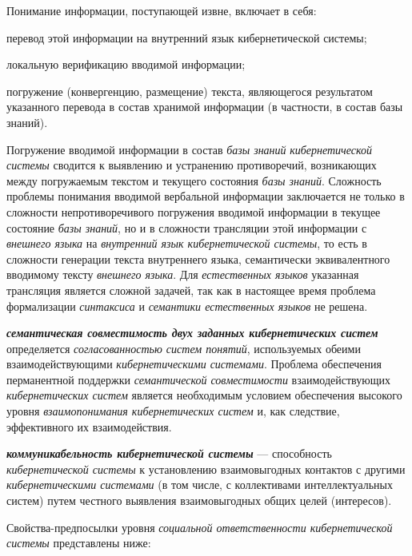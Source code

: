 Понимание информации, поступающей извне, включает в себя:
\begin{textitemize}
    \item перевод этой информации на внутренний язык кибернетической системы;
    \item локальную верификацию вводимой информации;
    \item погружение (конвергенцию, размещение) текста, являющегося результатом указанного перевода в состав хранимой информации (в частности, в состав базы знаний).
\end{textitemize}

Погружение вводимой информации в состав \textit{базы знаний} \textit{кибернетической системы} сводится к выявлению и устранению противоречий, возникающих между погружаемым текстом и текущего состояния \textit{базы знаний}. Сложность проблемы понимания вводимой вербальной информации заключается не только в сложности непротиворечивого погружения вводимой информации в текущее состояние \textit{базы знаний}, но и в сложности трансляции этой информации с \textit{внешнего языка} на \textit{внутренний язык кибернетической системы}, то есть в сложности генерации текста внутреннего языка, семантически эквивалентного вводимому тексту \textit{внешнего языка}.
Для \textit{естественных языков} указанная трансляция является сложной задачей, так как в настоящее время проблема формализации \textit{синтаксиса} и \textit{семантики естественных языков} не решена.

\textbf{\textit{семантическая совместимость двух заданных кибернетических систем}} определяется \textit{согласованностью систем понятий}, используемых обеими взаимодействующими \textit{кибернетическими системами}.
Проблема обеспечения перманентной поддержки \textit{семантической совместимости} взаимодействующих \textit{кибернетических систем} является необходимым условием обеспечения высокого уровня \textit{взаимопонимания кибернетических систем} и, как следствие, эффективного их взаимодействия.

\textbf{\textit{коммуникабельность кибернетической системы}} --- способность \textit{кибернетической системы} к установлению взаимовыгодных контактов с другими \textit{кибернетическими системами} (в том числе, с коллективами интеллектуальных систем) путем честного выявления взаимовыгодных общих целей (интересов).

Свойства-предпосылки уровня \textit{социальной ответственности кибернетической системы} представлены ниже:

